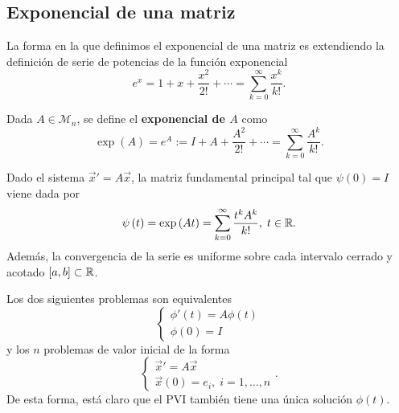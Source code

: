 \subsection{Exponencial de una matriz}
La forma en la que definimos el exponencial de una matriz es extendiendo la definición de serie de potencias de la función exponencial
\[e^{x}=1 + x + \frac{x^{2}}{2!} + \cdots = \sum^{\infty}_{k = 0}\frac{x^{k}}{k!} .\]
\begin{definition}
Dada $\displaystyle A \in \mathcal{M}_{n} $, se define el \textbf{exponencial de $\displaystyle A $} como
\[\exp\left(A\right)=e^{A}:= I + A + \frac{A^{2}}{2!} + \cdots = \sum^{\infty}_{k = 0}\frac{A^{k}}{k!} .\]
\end{definition}
\begin{theorem}
Dado el sistema $\displaystyle \vec{x}' = A \vec{x} $, la matriz fundamental principal tal que $\displaystyle \psi\left(0\right)=I $ viene dada por
\[\psi\left(t\right)=\exp\left(At\right)=\sum^{\infty}_{k = 0}\frac{t ^{k}A^{k}}{k!}, \; t \in \mathbb{R} .\]
Además, la convergencia de la serie es uniforme sobre cada intervalo cerrado y acotado $\displaystyle \left[a,b\right] \subset \mathbb{R} $. 
\end{theorem}
\begin{observation}
Los dos siguientes problemas son equivalentes
\[
\begin{cases}
\phi'\left(t\right)=A\phi\left(t\right) \\
\phi\left(0\right)=I
\end{cases}
\]
y los $\displaystyle n $ problemas de valor inicial de la forma 
\[
\begin{cases}
\vec{x}' = A\vec{x} \\
\vec{x}\left(0\right)=e_{i}, \; i = 1, \ldots, n
\end{cases}
.\]
De esta forma, está claro que el PVI también tiene una única solución $\displaystyle \phi\left(t\right) $.
\end{observation}

